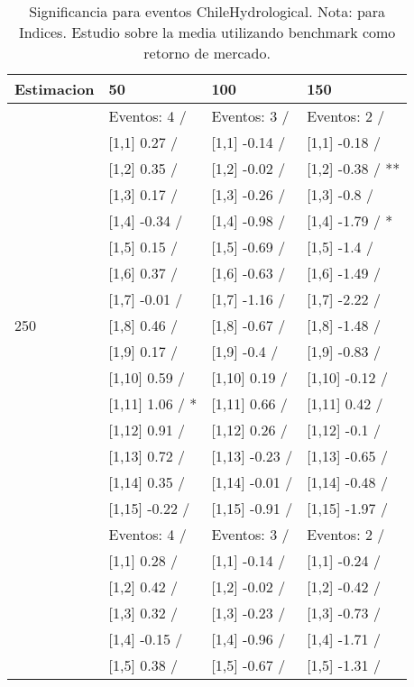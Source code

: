 \begin{table}

\caption{Significancia para eventos ChileHydrological. Nota: para Indices. Estudio sobre la media utilizando benchmark como retorno de mercado.}
\centering
\begin{tabular}[t]{llll}
\toprule
Estimacion & 50 & 100 & 150\\
\midrule
 & Eventos:  4 / & Eventos:  3 / & Eventos:  2 /\\
 & {}[1,1] 0.27  / & {}[1,1] -0.14  / & {}[1,1] -0.18  /\\
 & {}[1,2] 0.35  / & {}[1,2] -0.02  / & {}[1,2] -0.38  / **\\
 & {}[1,3] 0.17  / & {}[1,3] -0.26  / & {}[1,3] -0.8  /\\
 & {}[1,4] -0.34  / & {}[1,4] -0.98  / & {}[1,4] -1.79  / *\\
\addlinespace
 & {}[1,5] 0.15  / & {}[1,5] -0.69  / & {}[1,5] -1.4  /\\
 & {}[1,6] 0.37  / & {}[1,6] -0.63  / & {}[1,6] -1.49  /\\
 & {}[1,7] -0.01  / & {}[1,7] -1.16  / & {}[1,7] -2.22  /\\
250 & {}[1,8] 0.46  / & {}[1,8] -0.67  / & {}[1,8] -1.48  /\\
 & {}[1,9] 0.17  / & {}[1,9] -0.4  / & {}[1,9] -0.83  /\\
\addlinespace
 & {}[1,10] 0.59  / & {}[1,10] 0.19  / & {}[1,10] -0.12  /\\
 & {}[1,11] 1.06  / * & {}[1,11] 0.66  / & {}[1,11] 0.42  /\\
 & {}[1,12] 0.91  / & {}[1,12] 0.26  / & {}[1,12] -0.1  /\\
 & {}[1,13] 0.72  / & {}[1,13] -0.23  / & {}[1,13] -0.65  /\\
 & {}[1,14] 0.35  / & {}[1,14] -0.01  / & {}[1,14] -0.48  /\\
\addlinespace
 & {}[1,15] -0.22  / & {}[1,15] -0.91  / & {}[1,15] -1.97  /\\
 & Eventos:  4 / & Eventos:  3 / & Eventos:  2 /\\
 & {}[1,1] 0.28  / & {}[1,1] -0.14  / & {}[1,1] -0.24  /\\
 & {}[1,2] 0.42  / & {}[1,2] -0.02  / & {}[1,2] -0.42  /\\
 & {}[1,3] 0.32  / & {}[1,3] -0.23  / & {}[1,3] -0.73  /\\
\addlinespace
 & {}[1,4] -0.15  / & {}[1,4] -0.96  / & {}[1,4] -1.71  /\\
 & {}[1,5] 0.38  / & {}[1,5] -0.67  / & {}[1,5] -1.31  /\\

\end{tabular}
\end{table}
